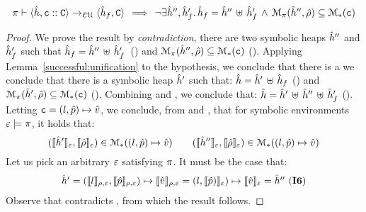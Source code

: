 \begin{lemma} 
$$
\begin{array}{l}
\pi \vdash \langle \hat{h}, \mathtt{c} :: \mathtt{C} \rangle \rightarrow_{\cal CU} \langle \hat{h}_f, \mathtt{C} \rangle \, \implies \,
	 \neg\exists \hat{h}'', \hat{h}_f' . \, \hat{h}_f = \hat{h}'' \, \uplus \, \hat{h}_f' \, \wedge \, 
                \mathcal{M}_{\pi}(\hat{h}'', \hat\rho) \subseteq \mathcal{M}_{*}(\mathtt{c})
\end{array}
$$
\end{lemma}
\begin{proof}
We prove the result by \emph{contradiction}, there are two symbolic heaps $\hat{h}''$ and $\hat{h}_f'$ such that
$\hat{h}_f = \hat{h}'' \, \uplus \, \hat{h}_f'$~() and $\mathcal{M}_{\pi}(\hat{h}'', \hat\rho) \subseteq \mathcal{M}_{*}(\mathtt{c})$ (). 
 Applying Lemma~\ref{successful:unification} to the hypothesis, we conclude that there is a 
 we conclude that there is a symbolic heap $\hat{h}'$ such that: $\hat{h} = \hat{h}' \, \uplus \, \hat{h}_f$ () and 
 $\mathcal{M}_{\pi}(\hat{h}', \hat\rho) \subseteq \mathcal{M}_{*}(\mathtt{c})$ (). 
 Combining  and , we conclude that: $\hat{h} = \hat{h}' \, \uplus \, \hat{h}'' \, \uplus \, \hat{h}_f'$ (). 
Letting $\mathtt{c} = (l, \hat{p}) \mapsto \hat{v}$, we conclude, from  and , that for symbolic 
environments $\varepsilon \models \pi$, it holds that: 
$$
(\llbracket \hat{h}' \rrbracket_{\varepsilon}, \llbracket \hat\rho \rrbracket_{\varepsilon}) \in \mathcal{M}_{*}((l, \hat{p})\mapsto \hat{v}) 
\qquad 
(\llbracket \hat{h}'' \rrbracket_{\varepsilon}, \llbracket \hat\rho \rrbracket_{\varepsilon}) \in \mathcal{M}_{*}((l, \hat{p}) \mapsto \hat{v})
$$
Let us pick an arbitrary $\varepsilon$ satisfying $\pi$. It must be the case that: 
$$
\begin{array}{l}
\hat{h}' = (\llbracket l \rrbracket_{\rho, \varepsilon}, \llbracket \hat{p} \rrbracket_{\rho, \varepsilon}) \mapsto \llbracket \hat{v} \rrbracket_{\rho, \varepsilon} 
 =  (l, \llbracket \hat{p}) \rrbracket_{\varepsilon}) \mapsto \llbracket \hat{v} \rrbracket_{\varepsilon}
 = \hat{h}'' \text{ ({\bf I6})}
\end{array}
$$
Observe that  contradicts , from which the result follows.
 \end{proof}


